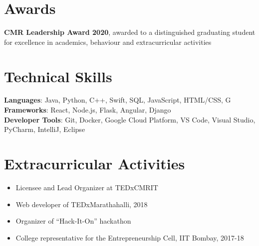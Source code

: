 \documentclass[letterpaper,11pt]{article}
\newcommand{\resumeItem}[1]{
  \item\small{
    {#1 \vspace{-2pt}}
  }
}
\newcommand{\resumeItemListStart}{\begin{itemize}}
\newcommand{\resumeItemListEnd}{\end{itemize}\vspace{-5pt}}
\begin{document}
\section{Awards}
 \begin{itemize}[leftmargin=0.15in, label={}]
    \small{\item{
     \textbf{CMR Leadership Award 2020}{, awarded to a distinguished graduating student for excellence in academics, behaviour and extracurricular activities} 
    }}
 \end{itemize}
 
\section{Technical Skills}
 \begin{itemize}[leftmargin=0.15in, label={}]
    \small{\item{
     \textbf{Languages}{: Java, Python, C++, Swift, SQL, JavaScript, HTML/CSS, G} \\
     \textbf{Frameworks}{: React, Node.js, Flask, Angular, Django} \\
     \textbf{Developer Tools}{: Git, Docker, Google Cloud Platform, VS Code, Visual Studio, PyCharm, IntelliJ, Eclipse} \\
    }}
 \end{itemize}


\section{Extracurricular Activities }
\small  \resumeItemListStart
            \resumeItem{Licensee and Lead Organizer at TEDxCMRIT }
            \resumeItem{Web developer of TEDxMarathahalli, 2018}
            \resumeItem{Organizer of “Hack-It-On” hackathon}
            \resumeItem{College representative for the Entrepreneurship Cell, IIT Bombay, 2017-18}
\resumeItemListEnd


\end{document}
